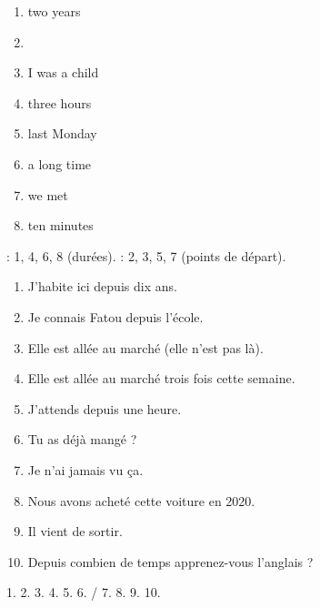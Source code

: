\begin{exo}
\begin{enumerate}
  \item \trou[1.5cm] two years \item {} \item \trou[1.5cm] I was a child
  \item \trou[1.5cm] three hours \item \trou[1.5cm] last Monday \item \trou[1.5cm] a long time
  \item \trou[1.5cm] we met \item \trou[1.5cm] ten minutes
\end{enumerate}
\end{exo}
\begin{corrige}[4.2]
 : 1, 4, 6, 8 (durées). \quad {} : 2, 3, 5, 7 (points de départ).
\end{corrige}

\begin{exo}
\begin{enumerate}
  \item J'habite ici depuis dix ans. \item Je connais Fatou depuis l'école.
  \item Elle est allée au marché (elle n'est pas là). \item Elle est allée au marché trois fois cette semaine.
  \item J'attends depuis une heure. \item Tu as déjà mangé ? \item Je n'ai jamais vu ça.
  \item Nous avons acheté cette voiture en 2020. \item Il vient de sortir.
  \item Depuis combien de temps apprenez-vous l'anglais ?
\end{enumerate}
\end{exo}
\begin{corrige}[4.3]
1.  2. 
3.  4. 
5.  6.  / 
7.  8. 
9.  10. 
\end{corrige}

